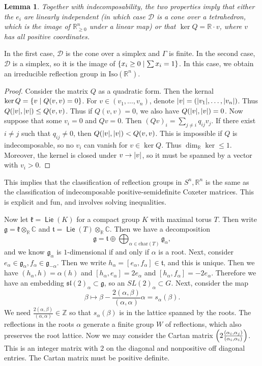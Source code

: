 \documentclass[leqno, openany]{memoir}
\newtheorem{lem}[thm]{Lemma}
\theoremstyle{definition}
\theoremstyle{remark}
\theoremstyle{plain}
\theoremstyle{definition}
\theoremstyle{remark}
\newcommand{\R}{\mathbb{R}}
\newcommand{\C}{\mathbb{C}}
\newcommand{\Z}{\mathbb{Z}}
\newcommand{\mc}[1]{\mathcal{#1}}
\newcommand{\mf}[1]{\mathfrak{#1}}
\newcommand{\mr}[1]{\mathrm{#1}}
\DeclareMathOperator{\Lie}{\mathsf{Lie}}
\begin{document}
\begin{lem} Together with indecomposability, the two properties imply that
    either the $e_i$ are linearly independent (in which case $\mc{D}$ is a cone
    over a tetrahedron, which is the image of $\R_{\geq 0}^n$ under a linear
    map) or that $\ker Q = \R \cdot v$, where $v$ has all positive coordinates.
\end{lem}

In the first case, $\mc{D}$ is the cone over a simplex and $\Gamma$ is finite.
In the second case, $\mc{D}$ is a simplex, so it is the image of $\qty{x_i \geq
0 \mid \sum x_i = 1}$. In this case, we obtain an irreducible reflection group
in $\mr{Iso}(\R^n)$.

\begin{proof} Consider the matrix $Q$ as a quadratic form. Then the kernal
    $\ker Q = \qty{v \mid Q(v,v) = 0}$. For $v \in (v_1, \ldots, v_n)$, denote
    $\abs{v} = (\abs{v_1}, \ldots, \abs{v_n})$. Thus $Q(\abs{v}, \abs{v}) \leq
    Q(v,v)$. Thus if $Q(v,v) = 0$, we also have $Q(\abs{v}, \abs{v}) = 0$. Now
    suppose that some $v_i = 0$ and $Qv = 0$. Then ${(Qv)}_i = \sum_{j \neq i}
    q_{ij} v_j$. If there exist $i \neq j$ such that $q_{ij} \neq 0$, then
    $Q(\abs{v}, \abs{v}) < Q(v,v)$. This is impossible if $Q$ is
    indecomposable, so no $v_i$ can vanish for $v \in \ker Q$. Thus $\dim_{\R}
    \ker \leq 1$. Moreover, the kernel is closed under $v \to \abs{v}$, so it
    must be spanned by a vector with $v_i > 0$.  \end{proof}

This implies that the classification of reflection groups in $S^n, \R^n$ is the
same as the classification of indecomposable positive-semidefinite Coxeter
matrices. This is explicit and fun, and involves solving inequalities. 

Now let $\mf{k} = \Lie(K)$ for a compact group $K$ with maximal torus $T$. Then
write $\mf{g} = \mf{k} \otimes_{\R} \C$ and $\mf{t} = \Lie(T) \otimes_{\R} \C$.
Then we have a decomposition \[ \mf{g} = \mf{t} \oplus \bigoplus_{\alpha \in
\mr{char}(T)} \mf{g}_{\alpha}, \] and we know $\mf{g}_{\alpha}$ is
$1$-dimensional if and only if $\alpha$ is a root. Next, consider $e_{\alpha}
\in \mf{g}_{\alpha}, f_{\alpha} \in \mf{g}_{-\alpha}$. Then we write
$h_{\alpha} = [e_{\alpha}, f_{\alpha}] \in \mf{t}$, and this is unique. Then we
have $(h_{\alpha}, h) = \alpha(h)$ and $[h_{\alpha}, e_{\alpha}] = 2
e_{\alpha}$ and $[h_{\alpha}, f_{\alpha}] = -2 e_{\alpha}$. Therefore we have
an embedding ${\mf{sl}(2)}_{\alpha} \subset \mf{g}$, so an ${SL(2)}_{\alpha}
\subset G$. Next, consider the map \[ \beta \mapsto \beta - \frac{2(\alpha,
\beta)}{(\alpha, \alpha)} \alpha = s_{\alpha}(\beta). \] We need
$\frac{2(\alpha,\beta)}{(\alpha, \alpha)} \in \Z$ so that $s_{\alpha}(\beta)$
is in the lattice spanned by the roots. The reflections in the roots $\alpha$
generate a finite group $W$ of reflections, which also preserves the root
lattice. Now we may consider the Cartan matrix $\qty(2
\frac{(\alpha_i,\alpha_j)}{(\alpha_i, \alpha_i)})$. This is an integer matrix
with $2$ on the diagonal and nonpositive off diagonal entries. The Cartan
matrix must be positive definite.
\end{document}
